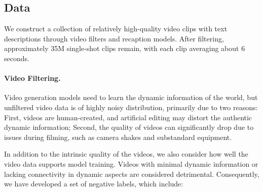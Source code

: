 \documentclass{article} \usepackage{iclr2024_conference,times}
\newcommand{\hide}[1]{}
\begin{document}
\hide{
\begin{wrapfigure}{r}{0.5\textwidth}
\centering
\texttt{[image: images/attention.png]}
\caption{The separated spatial and temporal attention makes it challenging to handle the large motion between adjacent frames. In the figure, the head of the person in frame $i+1$ cannot directly attend to the head in the frame $i$. Instead, visual information can only be implicitly transmitted through other background patches. This can lead to inconsistency issues in the generated videos.}
\label{fig:attention}
\vspace{-10mm}
\end{wrapfigure}
}



 \subsection{Data}


We construct a collection of relatively high-quality video clips with text descriptions through video filters and recaption models. After filtering, approximately 35M single-shot clips remain, with each clip averaging about 6 seconds. 



\paragraph{Video Filtering.}
Video generation models need to learn the dynamic information of the world, but unfiltered video data is of highly noisy distribution, primarily due to two reasons: 
First, videos are human-created, and artificial editing may distort the authentic dynamic information; 
Second, the quality of videos can significantly drop due to issues during filming, such as camera shakes and substandard equipment.

In addition to the intrinsic quality of the videos, we also consider how well the video data supports model training. 
Videos with minimal dynamic information or lacking connectivity in dynamic aspects are considered detrimental. 
Consequently, we have developed a set of negative labels, which include:
\end{document}
